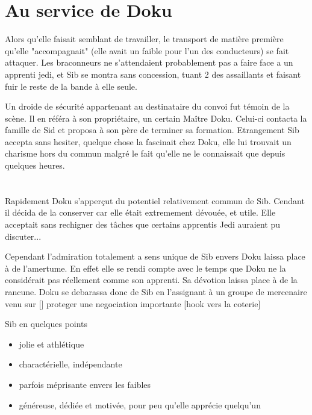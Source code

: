 \documentclass[10pt,a4paper,twoside,twocolumn,openany]{book}
\begin{document}
\section{Au service de Doku}

Alors qu'elle faisait semblant de travailler, le transport de matière première qu'elle "accompagnait" (elle avait un faible pour l'un des conducteurs) se fait attaquer. Les braconneurs ne s'attendaient probablement pas a faire face a un apprenti jedi, et Sib se montra sans concession, tuant 2 des assaillants et faisant fuir le reste de la bande à elle seule.   

Un droide de sécurité appartenant au destinataire du convoi fut témoin de la scène. Il en référa à son propriétaire, un certain Maître Doku. Celui-ci contacta la famille de Sid et proposa à son père de terminer sa formation.
Etrangement Sib accepta sans hesiter, quelque chose la fascinait chez Doku, elle lui trouvait un charisme hors du commun malgré le fait qu'elle ne le connaissait que depuis quelques heures.

\section{}
Rapidement Doku s'apperçut du potentiel relativement commun de Sib. Cendant il décida de la conserver car elle était extremement dévouée, et utile. Elle acceptait sans rechigner des tâches que certains apprentis Jedi auraient pu discuter...

Cependant l'admiration totalement a sens unique de Sib envers Doku laissa place à de l'amertume. En effet elle se rendi compte avec le temps que Doku ne la considérait pas réellement comme son apprenti. Sa dévotion laissa place à de la rancune. Doku se debarassa donc de Sib en l'assignant à un groupe de mercenaire venu sur [] proteger une negociation importante [hook vers la coterie]

\begin{commentbox}{Sib en quelques points}

\begin{itemize}
\item jolie et athlétique
\item charactérielle, indépendante
\item parfois méprisante envers les faibles
\item généreuse, dédiée et motivée, pour peu qu'elle apprécie quelqu'un
\end{itemize}

\end{commentbox}
\end{document}
